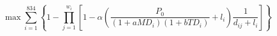 \documentclass[UTF8,a4paper]{ctexart}
\begin{document}
    \begin{equation}
\max \sum_{i=1}^{834} \left\{ 1 - \prod_{j=1}^{w_i} \left[ 1 - \alpha \left( \frac{P_0}{(1+aMD_i)(1+bTD_i)} + l_i \right) \frac{1}{d_{ij} + l_i} \right] \right\}
\end{equation}
\end{document}
